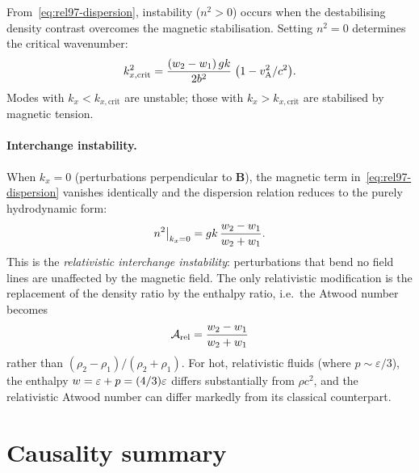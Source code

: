 From~\eqref{eq:rel97-dispersion}, instability ($n^{2}>0$) occurs when
the destabilising density contrast overcomes the magnetic stabilisation.
Setting $n^{2}=0$ determines the critical wavenumber:
\begin{equation}
  k_{x,\text{crit}}^{2}
    = \frac{(w_{2}-w_{1})\,gk}{2b^{2}}
      \;\bigl(1-v_{\mathrm{A}}^{2}/c^{2}\bigr).
  \label{eq:rel97-kcrit}
\end{equation}
Modes with $k_{x}<k_{x,\text{crit}}$ are unstable; those with
$k_{x}>k_{x,\text{crit}}$ are stabilised by magnetic tension.

\paragraph{Interchange instability.}
When $k_{x}=0$ (perturbations perpendicular to $\mathbf{B}$), the
magnetic term in~\eqref{eq:rel97-dispersion} vanishes identically and
the dispersion relation reduces to the purely hydrodynamic form:
\begin{equation}
  n^{2}\big|_{k_{x}=0}
    = gk\,\frac{w_{2}-w_{1}}{w_{2}+w_{1}}.
  \label{eq:rel97-interchange}
\end{equation}
This is the \emph{relativistic interchange instability}: perturbations
that bend no field lines are unaffected by the magnetic field.  The only
relativistic modification is the replacement of the density ratio by the
enthalpy ratio, i.e.\ the Atwood number becomes
\begin{equation}
  \mathcal{A}_{\text{rel}}
    = \frac{w_{2}-w_{1}}{w_{2}+w_{1}}
  \label{eq:rel97-Atwood}
\end{equation}
rather than $(\rho_{2}-\rho_{1})/(\rho_{2}+\rho_{1})$.  For hot,
relativistic fluids (where $p\sim\varepsilon/3$), the enthalpy
$w=\varepsilon+p=(4/3)\varepsilon$ differs substantially from
$\rho c^{2}$, and the relativistic Atwood number can differ markedly
from its classical counterpart.

\section{Causality summary}\label{sec:rel-96-97-causality}


